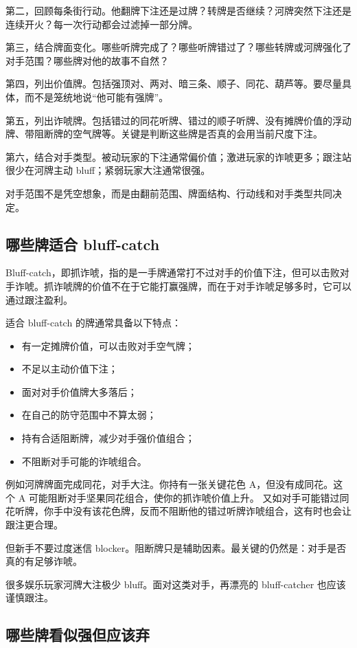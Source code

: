 第二，回顾每条街行动。他翻牌下注还是过牌？转牌是否继续？河牌突然下注还是连续开火？每一次行动都会过滤掉一部分牌。

第三，结合牌面变化。哪些听牌完成了？哪些听牌错过了？哪些转牌或河牌强化了对手范围？哪些牌对他的故事不自然？

第四，列出价值牌。包括强顶对、两对、暗三条、顺子、同花、葫芦等。要尽量具体，而不是笼统地说“他可能有强牌”。

第五，列出诈唬牌。包括错过的同花听牌、错过的顺子听牌、没有摊牌价值的浮动牌、带阻断牌的空气牌等。关键是判断这些牌是否真的会用当前尺度下注。

第六，结合对手类型。被动玩家的下注通常偏价值；激进玩家的诈唬更多；跟注站很少在河牌主动 bluff；紧弱玩家大注通常很强。

对手范围不是凭空想象，而是由翻前范围、牌面结构、行动线和对手类型共同决定。

\subsection{哪些牌适合 bluff-catch}

Bluff-catch，即抓诈唬，指的是一手牌通常打不过对手的价值下注，但可以击败对手诈唬。抓诈唬牌的价值不在于它能打赢强牌，而在于对手诈唬足够多时，它可以通过跟注盈利。

适合 bluff-catch 的牌通常具备以下特点：

\begin{itemize}
\item 有一定摊牌价值，可以击败对手空气牌；
\item 不足以主动价值下注；
\item 面对对手价值牌大多落后；
\item 在自己的防守范围中不算太弱；
\item 持有合适阻断牌，减少对手强价值组合；
\item 不阻断对手可能的诈唬组合。
\end{itemize}

例如河牌牌面完成同花，对手大注。你持有一张关键花色 A，但没有成同花。这个 A 可能阻断对手坚果同花组合，使你的抓诈唬价值上升。
又如对手可能错过同花听牌，你手中没有该花色牌，反而不阻断他的错过听牌诈唬组合，这有时也会让跟注更合理。

但新手不要过度迷信 blocker。阻断牌只是辅助因素。最关键的仍然是：对手是否真的有足够诈唬。

很多娱乐玩家河牌大注极少 bluff。面对这类对手，再漂亮的 bluff-catcher 也应该谨慎跟注。

\subsection{哪些牌看似强但应该弃}

